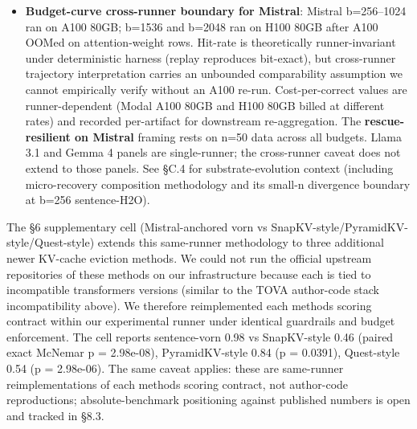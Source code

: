 \documentclass[10pt]{article}
\begin{document}
\begin{itemize}
 at 43/50 (paired exact McNemar p = 0.0156, one-directional 7-cell
 gap), with the caveat that the comparator includes guardrail +
 recent-window scaffolding that the author-code does not. Our
 implementation is faithful-direction-but-slightly-conservative on the
 one family where author-code permits comparison.
 Family-dependent implementation-faithfulness on Gemma 4, Llama 3.1,
 Qwen 2.5, and Qwen 3-NT is untested and is a partial-explanation
 hypothesis we cannot rule out. Section 5 should therefore be read as
 "vorn versus our same-runner attention-weight controls." Cross-family
 author-code verification is in \S{}8.3.
\item
 \textbf{Budget-curve cross-runner boundary for Mistral}: Mistral
 b=256--1024 ran on A100 80GB; b=1536 and b=2048 ran on H100 80GB after
 A100 OOMed on attention-weight rows. Hit-rate is theoretically
 runner-invariant under deterministic harness (replay reproduces
 bit-exact), but cross-runner trajectory interpretation carries an
 unbounded comparability assumption we cannot empirically verify
 without an A100 re-run. Cost-per-correct values are runner-dependent
 (Modal A100 80GB and H100 80GB billed at different rates) and recorded
 per-artifact for downstream re-aggregation. The
 \textbf{rescue-resilient on Mistral} framing rests on n=50 data
 across all budgets. Llama 3.1 and Gemma 4 panels are single-runner;
 the cross-runner caveat does not extend to those panels. See \S{}C.4
 for substrate-evolution context (including micro-recovery
 composition methodology and its small-n divergence boundary at
 b=256 sentence-H2O).
\end{itemize}

The \S{}6 supplementary cell (Mistral-anchored vorn vs
SnapKV-style/PyramidKV-style/Quest-style) extends this same-runner
methodology to three additional newer KV-cache eviction methods. We
could not run the official upstream repositories of these methods on our
infrastructure because each is tied to incompatible transformers
versions (similar to the TOVA author-code stack incompatibility above).
We therefore reimplemented each method\textquotesingle s scoring
contract within our experimental runner under identical guardrails and
budget enforcement. The cell reports sentence-vorn 0.98 vs SnapKV-style
0.46 (paired exact McNemar p = 2.98e-08), PyramidKV-style 0.84 (p =
0.0391), Quest-style 0.54 (p = 2.98e-06). The same caveat applies:
these are same-runner reimplementations of each method\textquotesingle s
scoring contract, not author-code reproductions; absolute-benchmark
positioning against published numbers is open and tracked in \S{}8.3.
\end{document}
